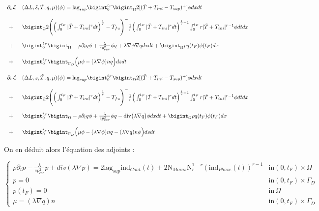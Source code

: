 \documentclass[11pt,a4paper]{article}
\begin{document}
\begin{equation}
\begin{array}{ll}
\partial_v\mathcal{L}&(\Delta L,\tilde{s},\tilde{T},q,\mu)(\phi)= \textrm{lag}_{sup} \bigint_{0}^{t_F}\bigint_{\Omega}2[(\tilde{T}+T_{ini}-T_{sup})^+]\phi dxdt\\
\\
\,\, +&\bigint_{\Omega}2\Bigg(\Big(\int_{0}^{t_F}|\tilde{T}+T_{ini}|^rdt\Big)^{\frac{1}{r}}-T_{fu}\Bigg)^-\frac{1}{r}\Big(\int_{0}^{t_F}|\tilde{T}+T_{ini}|^rdt\Big)^{\frac{1}{r}-1}\int_{0}^{t_F}r|\tilde{T}+T_{ini}|^{r-1}\phi dtdx \\
\\
\,\, + &\bigint_{0}^{t_F}\bigint_{\Omega}-\rho\partial_t q \phi+ \frac{\lambda}{ep_{car}^2} \phi q+\lambda\nabla \phi\nabla q dxdt +\bigintO\rho q(t_F)\phi(t_F)dx \\
\\
\,\, + & \bigint_{0}^{t_F}\bigint_{\Gamma_D}\Big(\mu \phi-(\lambda\nabla \phi)nq \Big)dsdt\\
\end{array}
\end{equation}


\begin{equation}
\begin{array}{ll}
\partial_v\mathcal{L}&(\Delta L,\tilde{s},\tilde{T},q,\mu)(\phi)= \textrm{lag}_{sup} \bigint_{0}^{t_F}\bigint_{\Omega}2[(\tilde{T}+T_{ini}-T_{sup})^+]\phi dxdt\\
\\
\,\, +&\bigint_{\Omega}2\Bigg(\Big(\int_{0}^{t_F}|\tilde{T}+T_{ini}|^rdt\Big)^{\frac{1}{r}}-T_{fu}\Bigg)^-\frac{1}{r}\Big(\int_{0}^{t_F}|\tilde{T}+T_{ini}|^rdt\Big)^{\frac{1}{r}-1}\int_{0}^{t_F}r|\tilde{T}+T_{ini}|^{r-1}\phi dtdx \\
\\
\,\, + &\bigint_{0}^{t_F}\bigint_{\Omega}-\rho\partial_t q \phi+ \frac{\lambda}{ep_{car}^2} \phi q-\textrm{div}\big(\lambda\nabla q\big) \phi dxdt +\bigintO\rho q(t_F)\phi(t_F)dx \\
\\
\,\, + & \bigint_{0}^{t_F}\bigint_{\Gamma_D}\Big(\mu \phi-(\lambda\nabla \phi)nq-(\lambda\nabla q)n\phi \Big)dsdt\\
\end{array}
\end{equation}

On en déduit alors l'équation des adjoints :

\begin{equation}
\left\{
\begin{array}{ll}
\rho\partial_t p-\frac{\lambda}{ep_{car}^2} p+div(\lambda\nabla p)= 2\textrm{lag}_{sup}\textrm{ind}_{Cont}(t)+2\textrm{N}_{Moins}\textrm{N}_r^{1-r}(\textrm{ind}_{Phase}(t))^{r-1}& \textrm{in} (0,t_F)\times \Omega \\
p=0 & \textrm{in} (0,t_F)\times \Gamma_D \\
p(t_F)= 0 & \textrm{in} \, \Omega \\
\mu=(\lambda\nabla q)n & \textrm{in}(0,t_F)\times\Gamma_D
\end{array}
\right.
\end{equation}
\end{document}
